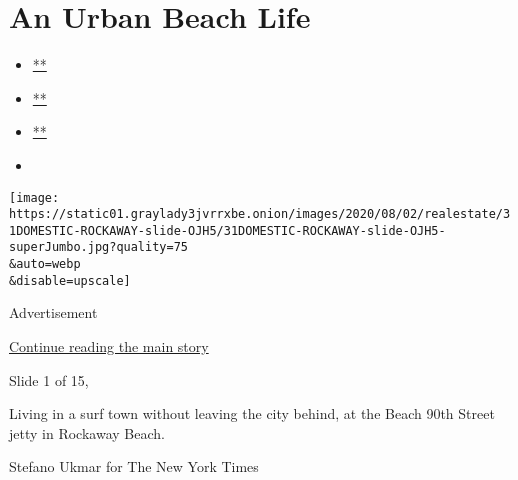 \hypertarget{an-urban-beach-life}{%
\section{An Urban Beach Life}\label{an-urban-beach-life}}

\begin{itemize}
\item
  \href{https://www.facebookcorewwwi.onion/sharer.php?app_id=9869919170\&u=https\%3A\%2F\%2Fwww.nytimes3xbfgragh.onion\%2Fslideshow\%2F2020\%2F07\%2F31\%2Frealestate\%2Fan-urban-beach-life.html\%3Fsmid\%3Dfb-share\&name=An\%20Urban\%20Beach\%20Life\&redirect_uri=https\%3A\%2F\%2Fwww.facebookcorewwwi.onion\%2F}{**}
\item
  \href{https://twitter.com/intent/tweet?url=https\%3A\%2F\%2Fwww.nytimes3xbfgragh.onion\%2Fslideshow\%2F2020\%2F07\%2F31\%2Frealestate\%2Fan-urban-beach-life.html\%3Fsmid\%3Dtw-share\&text=An\%20Urban\%20Beach\%20Life}{**}
\item
  \href{mailto:?subject=nytimes3xbfgragh.onion\%3A\%20An\%20Urban\%20Beach\%20Life\&body=From\%20The\%20New\%20York\%20Times\%3A\%0A\%0AAn\%20Urban\%20Beach\%20Life\%0A\%0ARockaway\%20Beach\%20has\%20a\%20land\%E2\%80\%99s-end\%20bacchanalian\%20spirit\%2C\%20but\%20it\%20also\%20feels\%20like\%20a\%20small\%20town.\%0A\%0Ahttps\%3A\%2F\%2Fwww.nytimes3xbfgragh.onion\%2Fslideshow\%2F2020\%2F07\%2F31\%2Frealestate\%2Fan-urban-beach-life.html\%3Fsmid\%3Dem-share}{**}
\item
\end{itemize}

\texttt{[image: https://static01.graylady3jvrrxbe.onion/images/2020/08/02/realestate/31DOMESTIC-ROCKAWAY-slide-OJH5/31DOMESTIC-ROCKAWAY-slide-OJH5-superJumbo.jpg?quality=75\\\&auto=webp\\\&disable=upscale]}

Advertisement

\protect\hyperlink{after-right-0}{Continue reading the main story}

Slide 1 of 15,

Living in a surf town without leaving the city behind, at the Beach 90th
Street jetty in Rockaway Beach.

Stefano Ukmar for The New York Times

